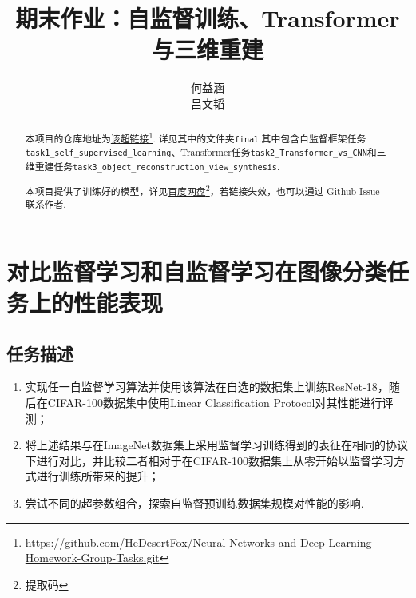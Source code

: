 \documentclass[notitlepage,cs4size,punct,oneside]{ctexrep}
\title{{\zihao{1}\bfseries 期末作业：自监督训练、Transformer与三维重建}}
\author{何益涵 \quad 20307110032\\吕文韬 \quad 23210180109}
\date{}
\numberwithin{equation}{chapter}
\theoremstyle{mystyle}
\begin{document}
\CTEXoptions[abstractname={摘要: }]
\CTEXoptions[bibname={\bfseries 参考文献}]

\renewcommand{\thepage}{\roman{page}}
\setcounter{page}{1}

\maketitle\renewcommand{\thepage}{\arabic{page}}
\thispagestyle{empty}\setcounter{page}{0}
\renewcommand{\abstractname}{摘要: }
\begin{abstract}
     本项目的仓库地址为\href{https://github.com/HeDesertFox/Neural-Networks-and-Deep-Learning-Homework-Group-Tasks.git}{该超链接}\footnote{\href{https://github.com/HeDesertFox/Neural-Networks-and-Deep-Learning-Homework-Group-Tasks.git}{https://github.com/HeDesertFox/Neural-Networks-and-Deep-Learning-Homework-Group-Tasks.git}}. 详见其中的文件夹\texttt{final}.其中包含自监督框架任务\texttt{task1\_self\_supervised\_learning}、Transformer任务\texttt{task2\_Transformer\_vs\_CNN}和三维重建任务\texttt{task3\_object\_reconstruction\_view\_synthesis}.

     本项目提供了训练好的模型，详见\href{}{百度网盘}\footnote{提取码 }，若链接失效，也可以通过 Github Issue 联系作者.


\end{abstract}



\chapter{对比监督学习和自监督学习在图像分类任务上的性能表现}
\section{任务描述}
\begin{enumerate}
\item 实现任一自监督学习算法并使用该算法在自选的数据集上训练ResNet-18，随后在CIFAR-100数据集中使用Linear Classification Protocol对其性能进行评测；
\item 将上述结果与在ImageNet数据集上采用监督学习训练得到的表征在相同的协议下进行对比，并比较二者相对于在CIFAR-100数据集上从零开始以监督学习方式进行训练所带来的提升；
\item 尝试不同的超参数组合，探索自监督预训练数据集规模对性能的影响.
\end{enumerate}
\end{document}
